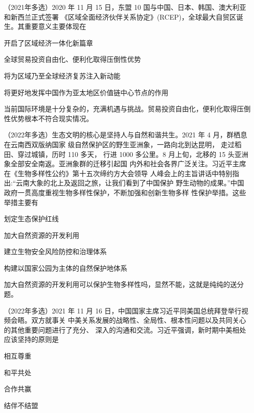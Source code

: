 \documentclass[lang=cn,blue,10pt,scheme=chinese,twocol]{zznote}
\begin{document}
\begin{example} （2021年多选）2020 年 11 月 15 日，东盟 10 国与中国、日本、韩国、澳大利亚和新西兰正式签署
	《区域全面经济伙伴关系协定》(RCEP)，全球最大自贸区诞生。其重要意义主要体现在
	\begin{choice}
		\item 开启了区域经济一体化新篇章
		\item 全球贸易投资自由化、便利化取得压倒性优势
		\item 将为区域乃至全球经济复苏注入新动能
		\item 将更好地发挥中国作为亚太地区价值链中心节点的作用
	\end{choice}
\end{example}
\begin{solution}
	当前国际环境是十分复杂的，充满机遇与挑战。贸易投资自由化，便利化取得压倒性优势根本不符合现实情况。
\end{solution}
\begin{example}	（2022年多选）生态文明的核心是坚持人与自然和谐共生。2021 年 4 月，群栖息在云南西双版纳国家
	级自然保护区的野生亚洲象，一路向北到达昆明， 走过稻田、穿过城镇，历时 110 多天，
	行进 1000 多公里。8 月上旬，北移的 15 头亚洲象全部安全南返。亚洲象群的迁移引起国
	内外和社会各界广泛关注。习近平主席在《生物多样性公约》第十五次缔约方大会领导
	人峰会上的主旨讲话中特别指出:“云南大象的北上及返回之旅，让我们看到了中国保护
	野生动物的成果。”中国政府一贯高度重视生物多样性保护，不断加强和创新生物多样
	性保护举措。这些举措主要有

	\begin{choice}
		\item 划定生态保护红线
		\item 加大自然资源的开发利用
		\item 建立生物安全风险防控和治理体系
		\item 构建以国家公园为主体的自然保护地体系
	\end{choice}
\end{example}
\begin{solution}
	加大自然资源的开发利用可以保护生物多样性吗，显然不能，这就是纯纯的送分题。
\end{solution}
\begin{example} （2022年多选）2021 年 11 月 16 日，中国国家主席习近平同美国总统拜登举行视频会晤。双方就事关
	中美关系发展的战略性、全局性、根本性问题以及共同关心的其他重要问题进行了充分、
	深入的沟通和交流。习近平强调，新时期中美相处应该坚持的原则是
	\begin{choice}
		\item 相互尊重
		\item 和平共处
		\item 合作共赢
		\item 结伴不结盟
	\end{choice}
\end{example}
\end{document}
